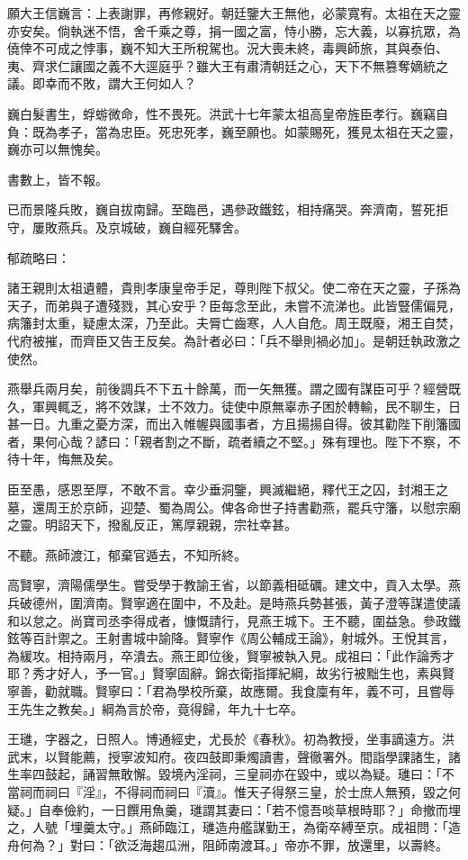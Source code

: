 \begin{pinyinscope}
願大王信巍言：上表謝罪，再修親好。朝廷鑒大王無他，必蒙寬宥。太祖在天之靈亦安矣。倘執迷不悟，舍千乘之尊，捐一國之富，恃小勝，忘大義，以寡抗眾，為僥倖不可成之悖事，巍不知大王所稅駕也。況大喪未終，毒興師旅，其與泰伯、夷、齊求仁讓國之義不大逕庭乎？雖大王有肅清朝廷之心，天下不無篡奪嫡統之議。即幸而不敗，謂大王何如人？

巍白髮書生，蜉蝣微命，性不畏死。洪武十七年蒙太祖高皇帝旌臣孝行。巍竊自負：既為孝子，當為忠臣。死忠死孝，巍至願也。如蒙賜死，獲見太祖在天之靈，巍亦可以無愧矣。

書數上，皆不報。

已而景隆兵敗，巍自拔南歸。至臨邑，遇參政鐵鉉，相持痛哭。奔濟南，誓死拒守，屢敗燕兵。及京城破，巍自經死驛舍。

郁疏略曰：

諸王親則太祖遺體，貴則孝康皇帝手足，尊則陛下叔父。使二帝在天之靈，子孫為天子，而弟與子遭殘戮，其心安乎？臣每念至此，未嘗不流涕也。此皆豎儒偏見，病籓封太重，疑慮太深，乃至此。夫脣亡齒寒，人人自危。周王既廢，湘王自焚，代府被摧，而齊臣又告王反矣。為計者必曰：「兵不舉則禍必加」。是朝廷執政激之使然。

燕舉兵兩月矣，前後調兵不下五十餘萬，而一矢無獲。謂之國有謀臣可乎？經營既久，軍興輒乏，將不效謀，士不效力。徒使中原無辜赤子困於轉輸，民不聊生，日甚一日。九重之憂方深，而出入帷幄與國事者，方且揚揚自得。彼其勸陛下削籓國者，果何心哉？諺曰：「親者割之不斷，疏者續之不堅。」殊有理也。陛下不察，不待十年，悔無及矣。

臣至愚，感恩至厚，不敢不言。幸少垂洞鑒，興滅繼絕，釋代王之囚，封湘王之墓，還周王於京師，迎楚、蜀為周公。俾各命世子持書勸燕，罷兵守籓，以慰宗廟之靈。明詔天下，撥亂反正，篤厚親親，宗社幸甚。

不聽。燕師渡江，郁棄官遁去，不知所終。

高賢寧，濟陽儒學生。嘗受學于教諭王省，以節義相砥礪。建文中，貢入太學。燕兵破德州，圍濟南。賢寧適在圍中，不及赴。是時燕兵勢甚張，黃子澄等謀遣使議和以怠之。尚寶司丞李得成者，慷慨請行，見燕王城下。王不聽，圍益急。參政鐵鉉等百計禦之。王射書城中諭降。賢寧作《周公輔成王論》，射城外。王悅其言，為緩攻。相持兩月，卒潰去。燕王即位後，賢寧被執入見。成祖曰：「此作論秀才耶？秀才好人，予一官。」賢寧固辭。錦衣衛指揮紀綱，故劣行被黜生也，素與賢寧善，勸就職。賢寧曰：「君為學校所棄，故應爾。我食廩有年，義不可，且嘗辱王先生之教矣。」綱為言於帝，竟得歸，年九十七卒。

王璡，字器之，日照人。博通經史，尤長於《春秋》。初為教授，坐事謫遠方。洪武末，以賢能薦，授寧波知府。夜四鼓即秉燭讀書，聲徹署外。間詣學課諸生，諸生率四鼓起，誦習無敢懈。毀境內淫祠，三皇祠亦在毀中，或以為疑。璡曰：「不當祠而祠曰『淫』，不得祠而祠曰『瀆』。惟天子得祭三皇，於士庶人無預，毀之何疑。」自奉儉約，一日饌用魚羹，璡謂其妻曰：「若不憶吾啖草根時耶？」命撤而埋之，人號「埋羹太守。」燕師臨江，璡造舟艦謀勤王，為衛卒縛至京。成祖問：「造舟何為？」對曰：「欲泛海趨瓜洲，阻師南渡耳。」帝亦不罪，放還里，以壽終。


\end{pinyinscope}
